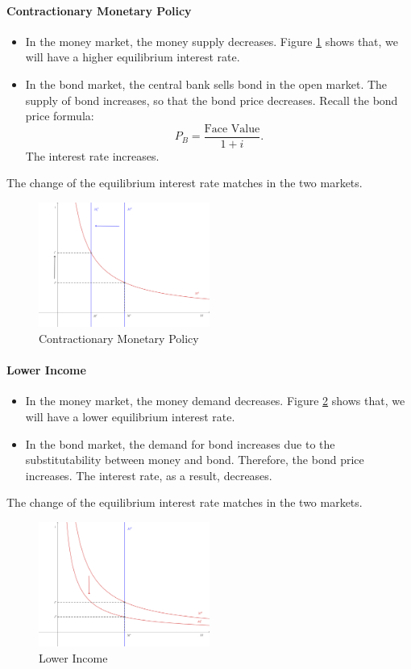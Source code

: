 \documentclass[12pt]{article}
\begin{document}
\paragraph{Contractionary Monetary Policy}
\begin{itemize}
	\item In the money market, the money supply decreases. Figure \ref{fig:money_eqm_02} shows that, we will have a higher equilibrium interest rate.
	\item In the bond market, the central bank sells bond in the open market. The supply of bond increases, so that the bond price decreases. Recall the bond price formula:
	\[P_B = \frac{\text{Face Value}}{1 + i}.\]
	The interest rate increases.
\end{itemize}
The change of the equilibrium interest rate matches in the two markets.

\begin{figure}[htp]
    \centering
    \includegraphics[width=0.5\textwidth]{money_eqm_02.png}
    \caption{Contractionary Monetary Policy}
    \label{fig:money_eqm_02}
\end{figure}

\paragraph{Lower Income}
\begin{itemize}
	\item In the money market, the money demand decreases. Figure \ref{fig:money_eqm_03} shows that, we will have a lower equilibrium interest rate.
	\item In the bond market, the demand for bond increases due to the substitutability between money and bond. Therefore, the bond price increases. The interest rate, as a result, decreases. 
\end{itemize}
The change of the equilibrium interest rate matches in the two markets.

\begin{figure}[htp]
    \centering
    \includegraphics[width=0.5\textwidth]{money_eqm_03.png}
    \caption{Lower Income}
    \label{fig:money_eqm_03}
\end{figure}
\end{document}
